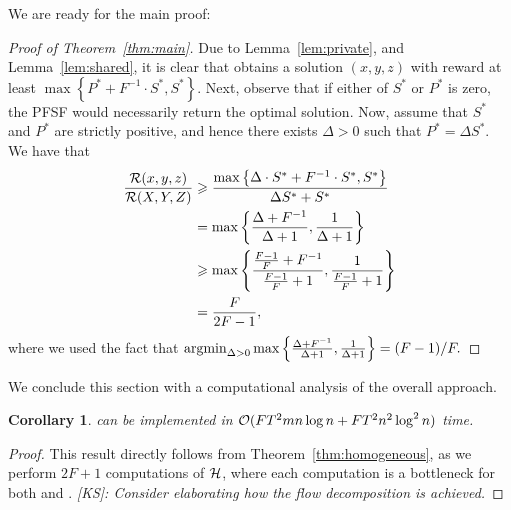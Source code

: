 \documentclass[conference]{IEEEtran}
\newcommand{\ksline}[2]{{\color{blue}#1}{\em \color{blue}[KS]: #2}}
\newcommand{\frline}[2]{{\color{blue}#1}{\em \color{blue}[FR]: #2}}
\newcommand{\ksline}[2]{#1}
\newcommand{\frline}[2]{#1}
\newtheorem{corollary}[theorem]{Corollary}
\begin{document}
We are ready for the main proof:
\begin{proof}[Proof of Theorem~\ref{thm:main}]
Due to Lemma~\ref{lem:private}, and Lemma~\ref{lem:shared}, it is clear that \alg obtains a solution $(x,y,z)$ with reward at least $\max\left\{P^*+F^{-1}\cdot S^*,S^*\right\}$. Next, observe that if either of $S^*$ or $P^*$ is zero, the PFSF would necessarily return the optimal solution. Now, assume that $S^*$ and $P^*$ are strictly positive, and hence there exists $\Delta>0$ such that $P^*=\Delta S^*$. 
We have that 
\begin{align*}
    \frac{\mathcal{R}(x,y,z)}{\mathcal{R}(X,Y,Z)} & \geqslant \frac{\max\left\{\Delta\cdot S^*+F^{-1}\cdot S^*,S^*\right\}}{\Delta S^*+S^*} \\ & 
    = \max\left\{\frac{\Delta+F^{-1}}{\Delta +1},\frac{1}{\Delta+1}\right\}\\ 
    & \geqslant 
    \max\left\{\frac{\frac{F-1}{F}+F^{-1}}{\frac{F-1}{F} +1},\frac{1}{\frac{F-1}{F}+1}\right\}\\ & = \frac{F}{2F-1},
\end{align*}
where we used the fact that $\argmin_{\Delta>0}\max\left\{\frac{\Delta+F^{-1}}{\Delta +1},\frac{1}{\Delta+1}\right\}=(F-1)/F.$
\end{proof}

We conclude this section with a computational analysis of the overall approach. 

\begin{corollary}
  \alg can be implemented in $\mathcal{O}(FT^2mn\log n+FT^2n^2\log^2n)$ time.
\end{corollary}
\begin{proof}
  This result directly follows from Theorem~\ref{thm:homogeneous}, as we perform $2F+1$ computations of $\mathcal{H}$, where each computation is a bottleneck for both \private and \shared. \ksline{}{Consider elaborating how the flow decomposition is achieved.}
\end{proof}

\end{document}
